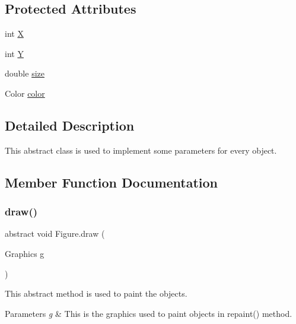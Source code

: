 \subsection*{Protected Attributes}
\begin{DoxyCompactItemize}
\item 
int \mbox{\hyperlink{class_figure_a51f58aeb00bfc8076424277e98dd3671}{X}}
\item 
int \mbox{\hyperlink{class_figure_a7a254120a4c69fb73048cfc9fdcdeebb}{Y}}
\item 
double \mbox{\hyperlink{class_figure_a538152f79733ae6b690797afd69aab57}{size}}
\item 
Color \mbox{\hyperlink{class_figure_a264181e47dd7b6155b4df4a772c2fd46}{color}}
\end{DoxyCompactItemize}


\subsection{Detailed Description}
This abstract class is used to implement some parameters for every object. 

\subsection{Member Function Documentation}
\mbox{\label{class_figure_ab46c536e10ff5b8546963b00d2fef7b4}} 
\subsubsection{\texorpdfstring{draw()}{draw()}}
{\footnotesize\ttfamily abstract void Figure.\+draw (\begin{DoxyParamCaption}\item[{Graphics}]{g }\end{DoxyParamCaption})\hspace{0.3cm}{\ttfamily [abstract]}}

This abstract method is used to paint the objects. 
\begin{DoxyParams}{Parameters}
{\em g} & This is the graphics used to paint objects in repaint() method. \\
\hline
\end{DoxyParams}
\mbox{\label{class_figure_a2c6e7cdb87fde8ce5f303c912e94ecba}} 
